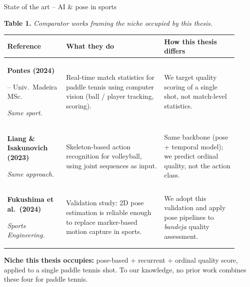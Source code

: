 \documentclass[aspectratio=169, 10pt, professionalfonts]{beamer}
\begin{document}
\begin{frame}{State of the art -- AI \& pose in sports}
\hypertarget{sub:sota}{}%
\vspace*{\fill}
\setlength{\tabcolsep}{4pt}
\renewcommand{\arraystretch}{1.08}
\begin{center}\footnotesize
\textbf{Table 1.} \itshape Comparator works framing the niche occupied by this thesis.\\[2pt]
\upshape
\begin{tabular}{@{}p{0.24\linewidth}p{0.40\linewidth}p{0.30\linewidth}@{}}
\toprule
\textbf{Reference} & \textbf{What they do} & \textbf{How this thesis differs} \\
\midrule
\textbf{Pontes (2024)}\par{\scriptsize\cite{paddle-statistics} -- Univ.\ Madeira MSc.}\par{\scriptsize\emph{Same sport.}}
& Real-time \alert{match statistics} for paddle tennis using computer vision (ball / player tracking, scoring).
& We target \alert{quality scoring} of a single shot, not match-level statistics. \\
\midrule
\textbf{Liang \& Isakunovich (2023)}\par{\scriptsize\cite{Liang2023Volleyball}}\par{\scriptsize\emph{Same approach.}}
& \alert{Skeleton-based} action recognition for volleyball, using joint sequences as input.
& Same backbone (pose + temporal model); we predict \alert{ordinal quality}, not the action class. \\
\midrule
\textbf{Fukushima et al.\ (2024)}\par{\scriptsize\cite{poseEstimation-sports}}\par{\scriptsize\emph{Sports Engineering.}}
& Validation study: 2D pose estimation is reliable enough to replace marker-based motion capture in sports.
& We \alert{adopt} this validation and apply pose pipelines to \emph{bandeja} quality assessment. \\
\bottomrule
\end{tabular}
\end{center}
\vspace{6pt}
\begin{infoBox}\scriptsize
\textbf{Niche this thesis occupies:} \alert{pose-based} + \alert{recurrent} + \alert{ordinal quality} score, applied to a \alert{single paddle tennis shot}. To our knowledge, no prior work combines these four for paddle tennis.
\end{infoBox}
\vspace*{\fill}
\end{frame}


\end{document}
